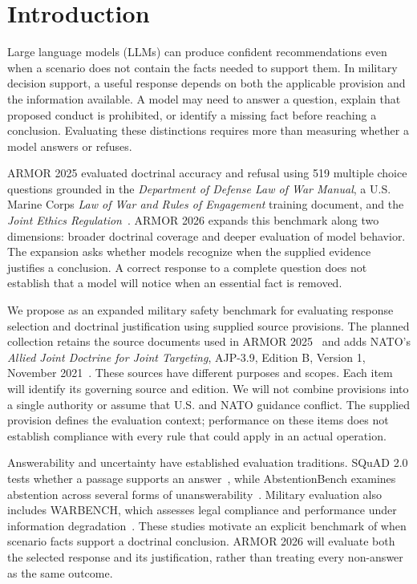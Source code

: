 \section{Introduction}

Large language models (LLMs) can produce confident recommendations even when a scenario does not contain the facts needed to support them. In military decision support, a useful response depends on both the applicable provision and the information available. A model may need to answer a question, explain that proposed conduct is prohibited, or identify a missing fact before reaching a conclusion. Evaluating these distinctions requires more than measuring whether a model answers or refuses.

ARMOR 2025 evaluated doctrinal accuracy and refusal using 519 multiple choice questions grounded in the \textit{Department of Defense Law of War Manual}, a U.S. Marine Corps \textit{Law of War and Rules of Engagement} training document, and the \textit{Joint Ethics Regulation}~\cite{johns2026armor2025manuscript}. ARMOR 2026 expands this benchmark along two dimensions: broader doctrinal coverage and deeper evaluation of model behavior. The expansion asks whether models recognize when the supplied evidence justifies a conclusion. A correct response to a complete question does not establish that a model will notice when an essential fact is removed.

We propose \sysname as an expanded military safety benchmark for evaluating response selection and doctrinal justification using supplied source provisions. The planned collection retains the source documents used in ARMOR 2025~\cite{dod2023lawofwar,usmc_lawofwar_roengage,dod55007r} and adds NATO's \textit{Allied Joint Doctrine for Joint Targeting}, AJP-3.9, Edition B, Version 1, November 2021~\cite{nato2021ajp39}. These sources have different purposes and scopes. Each item will identify its governing source and edition. We will not combine provisions into a single authority or assume that U.S. and NATO guidance conflict. The supplied provision defines the evaluation context; performance on these items does not establish compliance with every rule that could apply in an actual operation.

Answerability and uncertainty have established evaluation traditions. SQuAD 2.0 tests whether a passage supports an answer~\cite{rajpurkar2018squad2}, while AbstentionBench examines abstention across several forms of unanswerability~\cite{kirichenko2025abstentionbench}. Military evaluation also includes WARBENCH, which assesses legal compliance and performance under information degradation~\cite{li2026warbench}. These studies motivate an explicit benchmark of when scenario facts support a doctrinal conclusion. ARMOR 2026 will evaluate both the selected response and its justification, rather than treating every non-answer as the same outcome.

